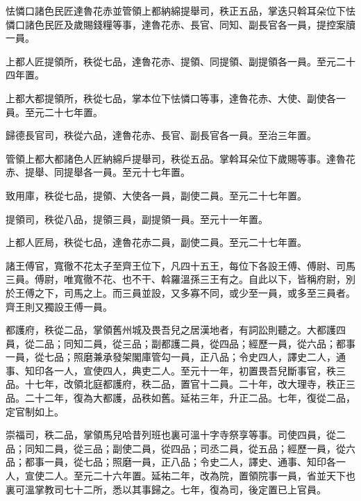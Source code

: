 \begin{pinyinscope}
 怯憐口諸色民匠達魯花赤並管領上都納綿提舉司，秩正五品，掌迭只斡耳朵位下怯憐口諸色民匠及歲賜錢糧等事，達魯花赤、長官、同知、副長官各一員，提控案牘一員。



 上都人匠提領所，秩從七品，達魯花赤、提領、同提領、副提領各一員。至元二十四年置。



 上都大都提領所，秩從七品，掌本位下怯憐口等事，達魯花赤、大使、副使各一員。至元二十七年置。



 歸德長官司，秩從六品，達魯花赤、長官、副長官各一員。至治三年置。



 管領上都大都諸色人匠納綿戶提舉司，秩從五品。掌斡耳朵位下歲賜等事。達魯花赤、提舉、同提舉各一員。至元十七年置。



 致用庫，秩從七品，提領、大使各一員，副使二員。至元二十七年置。



 提領司，秩從八品，提領三員，副提領一員。至元十一年置。



 上都人匠局，秩從七品，達魯花赤二員，副使二員。至元二十七年置。



 諸王傅官，寬徹不花太子至齊王位下，凡四十五王，每位下各設王傅、傅尉、司馬三員。傅尉，唯寬徹不花、也不干、斡羅溫孫三王有之。自此以下，皆稱府尉，別於王傅之下，司馬之上。而三員並設，又多寡不同，或少至一員，或多至三員者。齊王則又獨設王傅一員。



 都護府，秩從二品，掌領舊州城及畏吾兒之居漢地者，有詞訟則聽之。大都護四員，從二品；同知二員，從三品；副都護二員，從四品；經歷一員，從六品；都事一員，從七品；照磨兼承發架閣庫管勾一員，正八品；令史四人，譯史二人，通事、知印各一人，宣使四人，典吏二人。至元十一年，初置畏吾兒斷事官，秩三品。十七年，改領北庭都護府，秩二品，置官十二員。二十年，改大理寺，秩正三品。二十二年，復為大都護，品秩如舊。延祐三年，升正二品。七年，復從二品，定官制如上。



 崇福司，秩二品，掌領馬兒哈昔列班也裏可溫十字寺祭享等事。司使四員，從二品；同知二員，從三品；副使二員，從四品；司丞二員，從五品；經歷一員，從六品；都事一員，從七品；照磨一員，正八品；令史二人，譯史、通事、知印各一人，宣使二人。至元二十六年置。延祐二年，改為院，置領院事一員，省並天下也裏可溫掌教司七十二所，悉以其事歸之。七年，復為司，後定置已上官員。



\end{pinyinscope}